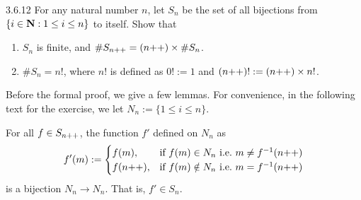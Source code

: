 \begin{exercise}{3.6.12}
	For any natural number $n$, let $S_n$ be the set of all bijections from $\{i \in \mathbf{N} : 1 \le i \le n\}$ to itself. Show that
	\begin{enumerate}
		\item $S_n$ is finite, and $\#S_{n{+}{+}} = (n{+}{+}) \times \#S_n$.
		\item $\#S_n = n!$, where $n!$ is defined as $0! := 1$ and $(n{+}{+})! := (n{+}{+})\times n!$.
	\end{enumerate}
\end{exercise}
Before the formal proof, we give a few lemmas. For convenience, in the following text for the exercise, we let $N_n := \{1 \le i \le n\}$. 
\begin{lem}\label{my.lem.exer.3.6.12.1}
	For all $f \in S_{n{+}{+}}$, the function $f'$ defined on $N_n$ as
		\[
			f'(m) := 
			\begin{cases}
				f(m), &\hbox{if } f(m) \in N_n \ \mathrm{i.e.}\ m \ne f^{-1}(\successor{n}) \\
				f(\successor{n}), &\hbox{if } f(m) \notin N_n \ \mathrm{i.e.}\ m = f^{-1}(\successor{n}) 
			\end{cases}
		\]
	is a bijection $N_n \to N_n$. That is, $f' \in S_n$.
\end{lem}
